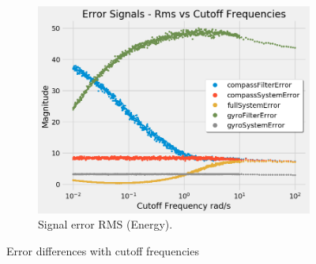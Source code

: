 \begin{figure}[H]
\begin{subfigure}{.5\textwidth}
\end{subfigure}
\begin{subfigure}{.5\textwidth}
  \centering
  \includegraphics[width=\linewidth, height=\paperheight/5]{img/iterable/errorsSignals/errorrmsSignals.png}  
  \caption{Signal error RMS (Energy).}
  \label{fig:error_rms}
\end{subfigure}
\caption{Error differences with cutoff frequencies}
\label{fig:sample_statistical_metrics}
\end{figure}





